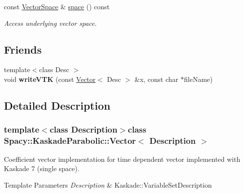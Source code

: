 \begin{DoxyCompactItemize}
\item 
\hypertarget{classSpacy_1_1VectorBase_aa999dbf9d679d895dfe04c10fbf9f5e9}{const \hyperlink{classSpacy_1_1VectorSpace}{Vector\-Space} \& \hyperlink{classSpacy_1_1VectorBase_aa999dbf9d679d895dfe04c10fbf9f5e9}{space} () const }\label{classSpacy_1_1VectorBase_aa999dbf9d679d895dfe04c10fbf9f5e9}

\begin{DoxyCompactList}\small\item\em Access underlying vector space. \end{DoxyCompactList}\end{DoxyCompactItemize}
\subsection*{Friends}
\begin{DoxyCompactItemize}
\item 
\hypertarget{classSpacy_1_1KaskadeParabolic_1_1Vector_ab070e6f4e9421ddf1de249ada48c6ca8}{{\footnotesize template$<$class Desc $>$ }\\void {\bfseries write\-V\-T\-K} (const \hyperlink{classSpacy_1_1KaskadeParabolic_1_1Vector}{Vector}$<$ Desc $>$ \&x, const char $\ast$file\-Name)}\label{classSpacy_1_1KaskadeParabolic_1_1Vector_ab070e6f4e9421ddf1de249ada48c6ca8}

\end{DoxyCompactItemize}


\subsection{Detailed Description}
\subsubsection*{template$<$class Description$>$class Spacy\-::\-Kaskade\-Parabolic\-::\-Vector$<$ Description $>$}

Coefficient vector implementation for time dependent vector implemented with Kaskade 7 (single space). 


\begin{DoxyTemplParams}{Template Parameters}
{\em Description} & Kaskade\-::\-Variable\-Set\-Description \\
\hline
\end{DoxyTemplParams}


